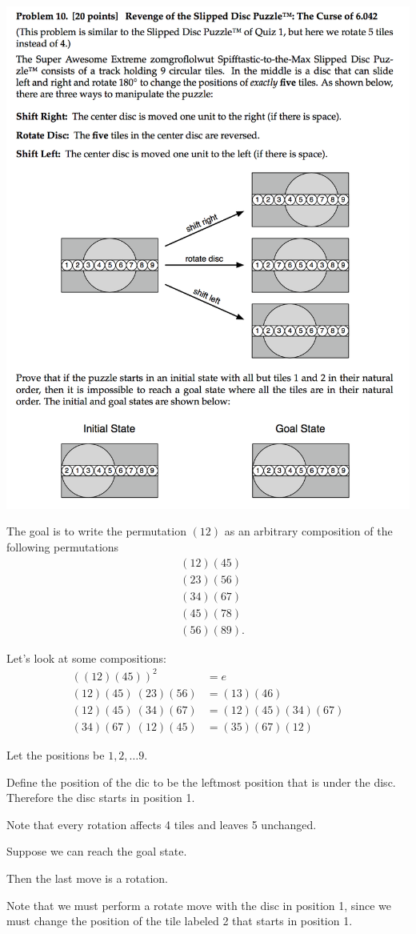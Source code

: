 \documentclass[12pt]{article}
\begin{document}
\newpage
\begin{mdframed}
\includegraphics[width=400pt]{img/MIT-math-for-cs-2008-10.png}
\end{mdframed}

The goal is to write the permutation $(12)$ as an arbitrary composition of the following
permutations
\begin{align*}
  &(12)(45)\\
  &(23)(56)\\
  &(34)(67)\\
  &(45)(78)\\
  &(56)(89).
\end{align*}

Let's look at some compositions:
\begin{align*}
  ((12)(45))^2        &= e\\
  (12)(45) ~ (23)(56) &= (13)(46)\\
  (12)(45) ~ (34)(67) &= (12)(45)(34)(67)\\
  (34)(67) ~ (12)(45) &= (35)(67)(12)
\end{align*}


Let the positions be $1, 2, \ldots 9$.

Define the position of the dic to be the leftmost position that is under the disc. Therefore the
disc starts in position 1.

Note that every rotation affects 4 tiles and leaves 5 unchanged.

Suppose we can reach the goal state.

Then the last move is a rotation.

Note that we must perform a rotate move with the disc in position 1, since we must change the
position of the tile labeled 2 that starts in position 1.
\end{document}
